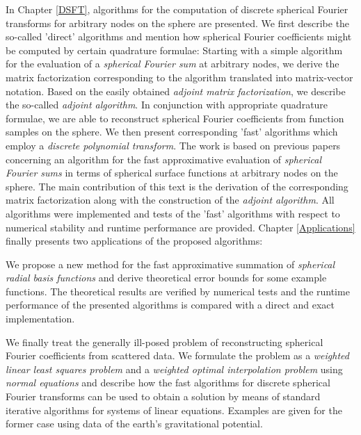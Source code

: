 In Chapter \ref{DSFT}, algorithms for the computation of discrete
spherical Fourier transforms for arbitrary nodes on the sphere 
are presented. We first describe the so-called 'direct' algorithms 
and mention how spherical Fourier coefficients might be computed 
by certain quadrature formulae: Starting with a simple algorithm 
for the evaluation of a \emph{spherical Fourier sum} at arbitrary 
nodes, we derive the matrix factorization corresponding to the 
algorithm translated into matrix-vector notation. Based on the 
easily obtained \emph{adjoint matrix factorization}, we 
describe the so-called \emph{adjoint algorithm}. In conjunction
with appropriate quadrature formulae, we are able to reconstruct
spherical Fourier coefficients from function samples on the sphere.
We then present corresponding 'fast' algorithms which employ a
\emph{discrete polynomial transform}. The work is based on 
previous papers concerning an algorithm for 
the fast approximative evaluation of \emph{spherical Fourier sums} 
in terms of spherical surface functions at arbitrary nodes on the 
sphere. The main contribution of this text is the derivation of the corresponding
matrix factorization along with the construction of the 
\emph{adjoint algorithm}. All algorithms were implemented and tests 
of the 'fast' algorithms with respect to numerical stability and 
runtime performance are provided.
Chapter \ref{Applications} finally presents two applications of the 
proposed algorithms: 

We propose a new method for the fast 
approximative summation of \emph{spherical radial basis functions}
and derive theoretical error bounds for some example functions. The 
theoretical results are verified by numerical tests and the runtime
performance of the presented algorithms is compared with a direct
and exact implementation.

We finally treat the generally ill-posed problem of reconstructing 
spherical Fourier coefficients from scattered data. We formulate
the problem as a \emph{weighted linear least squares problem}
and a \emph{weighted optimal interpolation problem} using
\emph{normal equations} and describe how the fast algorithms
for discrete spherical Fourier transforms can be used to obtain 
a solution by means of standard iterative algorithms for systems 
of linear equations. Examples are given for the former case using 
data of the earth's gravitational potential.

